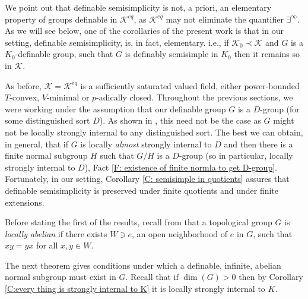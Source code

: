 \documentclass[11pt]{amsart}
\theoremstyle{definition}
\newcommand{\CK}{{\mathcal K}}
\newcommand{\0}{\emptyset}
\begin{document}
We point out that definable semisimplicity is not, a priori, an elementary property of groups definable in $\CK^{eq}$, as $\CK^{eq}$ may not eliminate the quantifier $\exists^\infty$. As we will see below, one of the  corollaries of the present work  is that in our setting, definable semisimplicity, is, in fact, elementary. 
i.e., if $\CK_0\prec \CK$ and $G$  is a $K_0$-definable group, such that $G$ is     definably semisimple in $K_0$ then it remains so in $\CK$. 


As before, $\CK=\CK^{eq}$ is a sufficiently saturated valued field, either power-bounded $T$-convex, $V$-minimal or $p$-adically closed. Throughout the previous sections, we were working under the assumption that our definable group $G$ is a $D$-group (for some distinguished sort $D$).  As shown in \cite{HaHaPeGps}, this need not be the case as $G$ might not be locally strongly internal to any distinguished sort. The best we can obtain, in general,  that if $G$ is locally \emph{almost} strongly internal to $D$  and then there is a finite normal subgroup $H$ such that $G/H$ is a $D$-group (so in particular, locally strongly internal to $D$), Fact \ref{F: existence of finite normla to get D-group}. Fortunately, in our setting,  Corollary \ref{C: semisimple in quotients} assures that definable semisimplicity is preserved under finite quotients and under finite extensions. 

Before  stating the first of the results, recall from \cite[\S 9.3]{JohnTopQp} that a topological group $G$ is \emph{locally abelian} if there exists $W\ni e$, an open neighborhood of $e$ in $G$,  such that $xy=yx$ for all $x,y\in W$. 



The next theorem gives conditions under which a definable,  infinite, abelian normal subgroup must exist in $G$. Recall that if $\dim(G)>0$ then by Corollary \ref{C:every thing is strongly internal to K} it is locally strongly internal to $K$.
\end{document}
